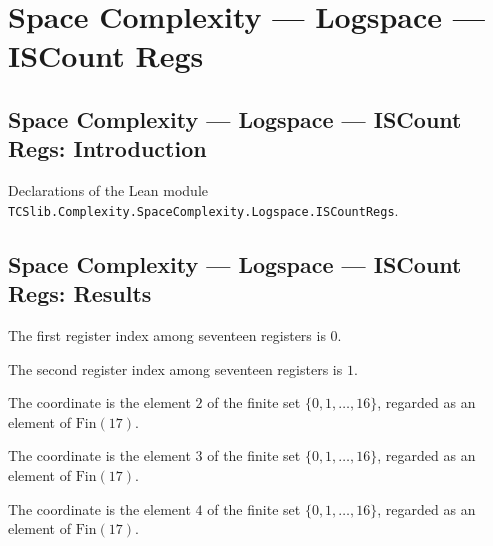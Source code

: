 \section{Space Complexity --- Logspace --- ISCount Regs}
\subsection*{Space Complexity --- Logspace --- ISCount Regs: Introduction}

Declarations of the Lean module \texttt{TCSlib.Complexity.SpaceComplexity.Logspace.ISCountRegs}.

\subsection*{Space Complexity --- Logspace --- ISCount Regs: Results}

\begin{definition}
\label{Complexity.LogProg.ISCount.rn}
\leanok
The first register index among seventeen registers is $0$.
\end{definition}

\begin{definition}
\label{Complexity.LogProg.ISCount.rlg}
\leanok
The second register index among seventeen registers is $1$.
\end{definition}

\begin{definition}
\label{Complexity.LogProg.ISCount.rk}
\leanok
The coordinate is the element $2$ of the finite set $\{0,1,\ldots,16\}$, regarded as an
element of $\mathrm{Fin}(17)$.
\end{definition}

\begin{definition}
\label{Complexity.LogProg.ISCount.rs}
\leanok
The coordinate is the element $3$ of the finite set $\{0,1,\ldots,16\}$, regarded as an
element of $\mathrm{Fin}(17)$.
\end{definition}

\begin{definition}
\label{Complexity.LogProg.ISCount.re}
\leanok
The coordinate is the element $4$ of the finite set $\{0,1,\ldots,16\}$, regarded as an
element of $\mathrm{Fin}(17)$.
\end{definition}

